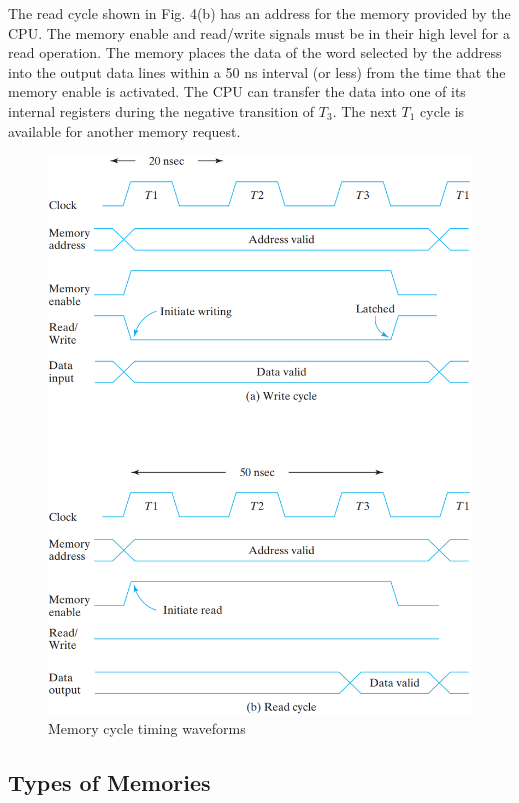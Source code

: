 The read cycle shown in Fig. 4(b) has an address for the memory provided by the CPU. The memory enable and read/write signals must be in their high level for a read operation. The memory places the data of the word selected by the address into the output data lines within a 50 ns interval (or less) from the time that the memory enable is activated. The CPU can transfer the data into one of its internal registers during the negative transition of $T_3$. The next $T_1$ cycle is available for another memory request.
\vspace*{\fill}
\columnbreak
\begin{figure}[H]
  \centering
  \includegraphics[width=\linewidth]{img/fig-7.4.png}
  \caption{Memory cycle timing waveforms}
  \label{fig:7.4}
\end{figure}


\subsection{Types of Memories}
\label{subsec:types-of-memories}

